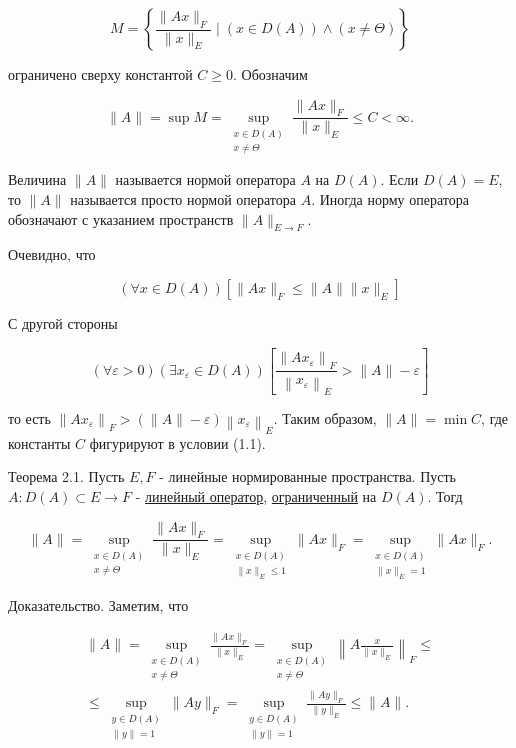 \documentclass[a4paper, 12pt]{extarticle}
\begin{document}
$$
	M=\left\{\frac{\|A x\|_{F}}{\|x\|_{E}} \mid(x \in D(A)) \wedge(x \neq \Theta)\right\}
$$

ограничено сверху константой $C \geq 0$. Обозначим

$$
	\|A\|=\sup M=\sup _{\substack{x \in D(A) \\ x \neq \Theta}} \frac{\|A x\|_{F}}{\|x\|_{E}} \leq C<\infty .
$$

Величина $\|A\|$ называется нормой оператора $A$ на $D(A)$. Если $D(A)=E$, то $\|A\|$ называется просто нормой оператора $A$. Иногда норму оператора обозначают с указанием пространств $\|A\|_{E \rightarrow F}$.

Очевидно, что

$$
	(\forall x \in D(A))\left[\|A x\|_{F} \leq\|A\|\|x\|_{E}\right]
$$

С другой стороны

$$
	(\forall \varepsilon>0)\left(\exists x_{\varepsilon} \in D(A)\right)\left[\frac{\left\|A x_{\varepsilon}\right\|_{F}}{\left\|x_{\varepsilon}\right\|_{E}}>\|A\|-\varepsilon\right]
$$

то есть $\left\|A x_{\varepsilon}\right\|_{F}>(\|A\|-\varepsilon)\left\|x_{\varepsilon}\right\|_{E}$. Таким образом, $\|A\|=\min C$, где константы $C$ фигурируют в условии (1.1).

Теорема 2.1. Пусть $E, F$ - линейные нормированные пространства. Пусть $A: D(A) \subset E \rightarrow F$ - \hyperlink{linOperator}{линейный оператор}, \hyperlink{ogranichenn}{ограниченный} на $D(A)$. Тогд

$$
	\|A\|=\sup _{\substack{x \in D(A) \\ x \neq \Theta}} \frac{\|A x\|_{F}}{\|x\|_{E}}=\sup _{\substack{x \in D(A) \\\|x\|_{E} \leq 1}}\|A x\|_{F}=\sup _{\substack{x \in D(A) \\\|x\|_{E}=1}}\|A x\|_{F} .
$$

Доказательство. Заметим, что

$$
	\begin{gathered}
		\|A\|=\sup _{\substack{x \in D(A) \\
				x \neq \Theta}} \frac{\|A x\|_{F}}{\|x\|_{E}}=\sup _{\substack{x \in D(A) \\
				x \neq \Theta}}\left\|A \frac{x}{\|x\|_{E}}\right\|_{F} \leq \\
		\leq \sup _{\substack{y \in D(A) \\
				\|y\|=1}}\|A y\|_{F}=\sup _{\substack{y \in D(A) \\
				\|y\|=1}} \frac{\|A y\|_{F}}{\|y\|_{E}} \leq\|A\| .
	\end{gathered}
$$
\end{document}
